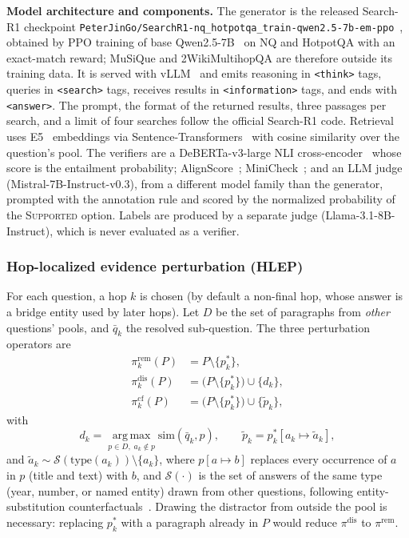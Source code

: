 \documentclass[conference]{IEEEtran}
\begin{document}
\textbf{Model architecture and components.}
The generator is the released Search-R1 checkpoint \nolinkurl{PeterJinGo/SearchR1-nq_hotpotqa_train-qwen2.5-7b-em-ppo}~\cite{jin2025searchr1}, obtained by PPO training of base Qwen2.5-7B~\cite{qwen2024qwen25} on NQ and HotpotQA with an exact-match reward; MuSiQue and 2WikiMultihopQA are therefore outside its training data. It is served with vLLM~\cite{kwon2023vllm} and emits reasoning in \texttt{<think>} tags, queries in \texttt{<search>} tags, receives results in \texttt{<information>} tags, and ends with \texttt{<answer>}. The prompt, the format of the returned results, three passages per search, and a limit of four searches follow the official Search-R1 code. Retrieval uses E5~\cite{wang2022e5} embeddings via Sentence-Transformers~\cite{reimers2019sbert} with cosine similarity over the question's pool. The verifiers are a DeBERTa-v3-large NLI cross-encoder~\cite{he2023debertav3,honovich2022true} whose score is the entailment probability; AlignScore~\cite{zha2023alignscore}; MiniCheck~\cite{tang2024minicheck}; and an LLM judge (Mistral-7B-Instruct-v0.3), from a different model family than the generator, prompted with the annotation rule and scored by the normalized probability of the \textsc{Supported} option. Labels are produced by a separate judge (Llama-3.1-8B-Instruct), which is never evaluated as a verifier.

\subsubsection{Hop-localized evidence perturbation (HLEP)}\label{sec:hlep}
For each question, a hop $k$ is chosen (by default a non-final hop, whose answer is a bridge entity used by later hops). Let $D$ be the set of paragraphs from \emph{other} questions' pools, and $\bar{q}_k$ the resolved sub-question. The three perturbation operators are
\begin{align}
\pi^{\mathrm{rem}}_k(P) &= P\setminus\{p_k^{*}\}, \nonumber\\
\pi^{\mathrm{dis}}_k(P) &= \big(P\setminus\{p_k^{*}\}\big)\cup\{d_k\}, \label{eq:perturb}\\
\pi^{\mathrm{cf}}_k(P) &= \big(P\setminus\{p_k^{*}\}\big)\cup\{\tilde{p}_k\}, \nonumber
\end{align}
with
\begin{equation}
d_k=\operatorname*{arg\,max}_{p\in D,\;a_k\notin p}\mathrm{sim}(\bar{q}_k,p),\qquad \tilde{p}_k=p_k^{*}[a_k\mapsto\tilde{a}_k],
\end{equation}
and $\tilde{a}_k\sim\mathcal{S}(\mathrm{type}(a_k))\setminus\{a_k\}$,
where $p[a\mapsto b]$ replaces every occurrence of $a$ in $p$ (title and text) with $b$, and $\mathcal{S}(\cdot)$ is the set of answers of the same type (year, number, or named entity) drawn from other questions, following entity-substitution counterfactuals~\cite{longpre2021entity}. Drawing the distractor from outside the pool is necessary: replacing $p_k^{*}$ with a paragraph already in $P$ would reduce $\pi^{\mathrm{dis}}$ to $\pi^{\mathrm{rem}}$.
\end{document}
